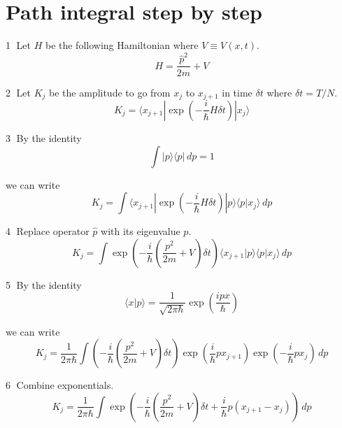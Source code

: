 

\section*{Path integral step by step}
\textcircled{\scriptsize1}
Let $H$ be the following Hamiltonian where $V\equiv V(x,t)$.
\begin{equation*}
H=\frac{\hat p^2}{2m}+V
\end{equation*}

\textcircled{\scriptsize2}
Let $K_j$ be the amplitude to go from $x_j$ to $x_{j+1}$
in time $\delta t$ where $\delta t=T/N$.
\begin{equation*}
K_j=\langle x_{j+1}|\exp\left(-\frac{i}{\hbar}H\delta t\right)|x_j\rangle
\end{equation*}

\textcircled{\scriptsize3}
By the identity
\begin{equation*}
\int|p\rangle\langle p|\,dp=1
\end{equation*}

we can write
\begin{equation*}
K_j=\int\langle x_{j+1}|\exp\left(-\frac{i}{\hbar}H\delta t\right)
|p\rangle\langle p|x_j\rangle\,dp
\end{equation*}

\textcircled{\scriptsize4}
Replace operator $\hat p$ with its eigenvalue $p$.
\begin{equation*}
K_j=\int
\exp\left(-\frac{i}{\hbar}\left(\frac{p^2}{2m}+V\right)\delta t\right)
\langle x_{j+1}|p\rangle\langle p|x_j\rangle\,dp
\end{equation*}

\textcircled{\scriptsize5}
By the identity
\begin{equation*}
\langle x|p\rangle=\frac{1}{\sqrt{2\pi\hbar}}\exp\left(\frac{ipx}{\hbar}\right)
\end{equation*}

we can write
\begin{equation*}
K_j=\frac{1}{2\pi\hbar}
\int
\left(-\frac{i}{\hbar}\left(\frac{p^2}{2m}+V\right)\delta t\right)
\exp\left(\frac{i}{\hbar}px_{j+1}\right)
\exp\left(-\frac{i}{\hbar}px_j\right)
\,dp
\end{equation*}

\textcircled{\scriptsize6}
Combine exponentials.
\begin{equation*}
K_j=\frac{1}{2\pi\hbar}
\int
\exp\left(-\frac{i}{\hbar}
\left(\frac{p^2}{2m}+V\right)
\delta t
+\frac{i}{\hbar}p(x_{j+1}-x_j)\right)
\,dp
\end{equation*}

